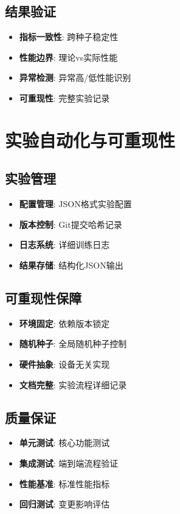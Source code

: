 \subsection{结果验证}
\begin{itemize}
    \item \textbf{指标一致性}: 跨种子稳定性
    \item \textbf{性能边界}: 理论vs实际性能
    \item \textbf{异常检测}: 异常高/低性能识别
    \item \textbf{可重现性}: 完整实验记录
\end{itemize}

\section{实验自动化与可重现性}

\subsection{实验管理}
\begin{itemize}
    \item \textbf{配置管理}: JSON格式实验配置
    \item \textbf{版本控制}: Git提交哈希记录
    \item \textbf{日志系统}: 详细训练日志
    \item \textbf{结果存储}: 结构化JSON输出
\end{itemize}

\subsection{可重现性保障}
\begin{itemize}
    \item \textbf{环境固定}: 依赖版本锁定
    \item \textbf{随机种子}: 全局随机种子控制
    \item \textbf{硬件抽象}: 设备无关实现
    \item \textbf{文档完整}: 实验流程详细记录
\end{itemize}

\subsection{质量保证}
\begin{itemize}
    \item \textbf{单元测试}: 核心功能测试
    \item \textbf{集成测试}: 端到端流程验证
    \item \textbf{性能基准}: 标准性能指标
    \item \textbf{回归测试}: 变更影响评估
\end{itemize}
